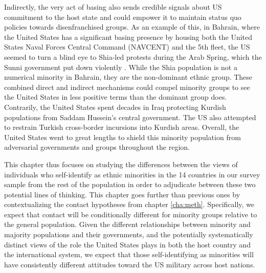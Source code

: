 
Indirectly, the very act of basing also sends credible signals about US commitment to the host state and could empower it to maintain status quo policies towards disenfranchised groups. As an example of this, in Bahrain, where the United States has a significant basing presence by housing both the United States Naval Forces Central Command (NAVCENT) and the 5th fleet, the US seemed to turn a blind eye to Shia-led protests during the Arab Spring, which the Sunni government put down violently \cite{McDaniel2013}. While the Shia population is not a numerical minority in Bahrain, they are the non-dominant ethnic group. These combined direct and indirect mechanisms could compel minority groups to see the United States in less positive terms than the dominant group does. Contrarily, the United States spent decades in Iraq protecting Kurdish populations from Saddam Hussein's central government. The US also attempted to restrain Turkish cross-border incursions into Kurdish areas. Overall, the United States went to great lengths to shield this minority population from adversarial governments and groups throughout the region. 

This chapter thus focuses on studying the differences between the views of individuals who self-identify as ethnic minorities in the 14 countries in our survey sample from the rest of the population in order to adjudicate between these two potential lines of thinking. This chapter goes further than previous ones by contextualizing the contact hypotheses from chapter \ref{cha:meth}. Specifically, we expect that contact will be conditionally different for minority groups relative to the general population. Given the different relationships between minority and majority populations and their governments, and the potentially systematically distinct views of the role the United States plays in both the host country and the international system, we expect that those self-identifying as minorities will have consistently different attitudes toward the US military across host nations. 



